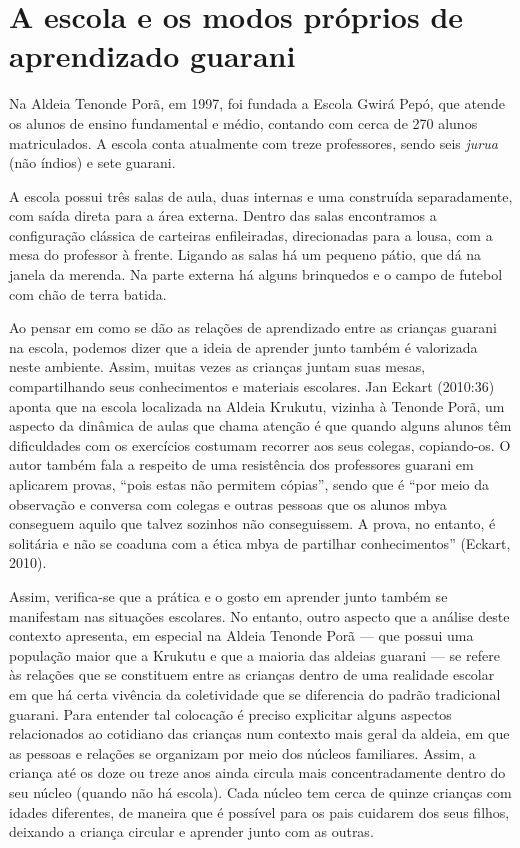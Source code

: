 \section{A escola e os modos próprios de aprendizado guarani}

Na Aldeia Tenonde Porã, em 1997, foi fundada a Escola Gwirá Pepó, que
atende os alunos de ensino fundamental e médio, contando com cerca de
270 alunos matriculados. A escola conta atualmente com treze
professores, sendo seis \emph{jurua} (não índios) e sete guarani.

A escola possui três salas de aula, duas internas e uma construída
separadamente, com saída direta para a área externa. Dentro das salas
encontramos a configuração clássica de carteiras enfileiradas,
direcionadas para a lousa, com a mesa do professor à frente. Ligando as
salas há um pequeno pátio, que dá na janela da merenda. Na parte
externa há alguns brinquedos e o campo de futebol com chão de terra
batida. 

Ao pensar em como se dão as relações de aprendizado entre as crianças
guarani na escola, podemos dizer que a ideia de aprender junto também é
valorizada neste ambiente. Assim, muitas vezes as crianças juntam suas
mesas, compartilhando seus conhecimentos e materiais escolares. Jan
Eckart (2010:36) aponta que na escola localizada na Aldeia Krukutu,
vizinha à Tenonde Porã, um aspecto da dinâmica de aulas que chama
atenção é que quando alguns alunos têm dificuldades com os exercícios
costumam recorrer aos seus colegas, copiando-os. O autor também fala a
respeito de uma resistência dos professores guarani em aplicarem
provas, ``pois estas não permitem cópias'', sendo que é ``por meio da
observação e conversa com colegas e outras pessoas que os alunos mbya
conseguem aquilo que talvez sozinhos não conseguissem. A prova, no
entanto, é solitária e não se coaduna com a ética mbya de partilhar
conhecimentos'' (Eckart, 2010).

Assim, verifica-se que a prática e o gosto em aprender junto também se
manifestam nas situações escolares. No entanto, outro aspecto que a
análise deste contexto apresenta, em especial na Aldeia Tenonde Porã ---
que possui uma população maior que a Krukutu e que a maioria das
aldeias guarani --- se refere às relações que se constituem entre as
crianças dentro de uma realidade escolar em que há certa vivência da
coletividade que se diferencia do padrão tradicional guarani. Para
entender tal colocação é preciso explicitar alguns aspectos
relacionados ao cotidiano das crianças num contexto mais geral da
aldeia, em que as pessoas e relações se organizam por meio dos núcleos
familiares. Assim, a criança até os doze ou treze anos ainda circula
mais concentradamente dentro do seu núcleo (quando não há escola). Cada
núcleo tem cerca de quinze crianças com idades diferentes, de maneira
que é possível para os pais cuidarem dos seus filhos, deixando a criança
circular e aprender junto com as outras.

